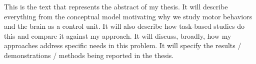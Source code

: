 \par\indent
	This is the text that represents the abstract of my thesis. It will describe everything from the conceptual model motivating why we study motor behaviors and the brain as a control unit. It will also describe how task-based studies do this and compare it against my approach. It will discuss, broadly, how my approaches address specific needs in this problem. It will specify the results / demonstrations / methods being reported in the thesis. 